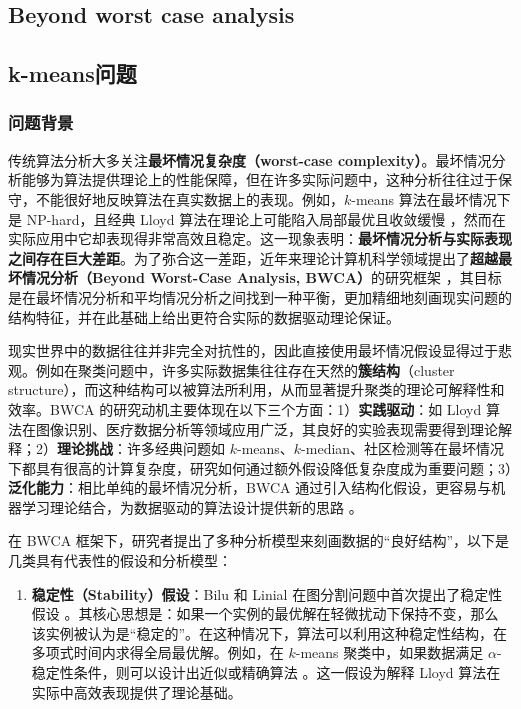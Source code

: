 \documentclass[lang=cn,newtx,10pt,scheme=chinese,chinesefont=nofont,citestyle=gb7714-2015, bibstyle=gb7714-2015]{elegantbook}
\begin{document}
\begin{refsection}
\chapter{Beyond worst case analysis}

\section{k-means问题}
\subsection{问题背景}

传统算法分析大多关注\textbf{最坏情况复杂度（worst-case complexity）}。最坏情况分析能够为算法提供理论上的性能保障，但在许多实际问题中，这种分析往往过于保守，不能很好地反映算法在真实数据上的表现。例如，$k$-means 算法在最坏情况下是 NP-hard，且经典 Lloyd 算法在理论上可能陷入局部最优且收敛缓慢 \cite{arthur2006kmeans, vattani2011hardness}，然而在实际应用中它却表现得非常高效且稳定。这一现象表明：\textbf{最坏情况分析与实际表现之间存在巨大差距}。为了弥合这一差距，近年来理论计算机科学领域提出了\textbf{超越最坏情况分析（Beyond Worst-Case Analysis, BWCA）}的研究框架 \cite{roughgarden2021beyond}，其目标是在最坏情况分析和平均情况分析之间找到一种平衡，更加精细地刻画现实问题的结构特征，并在此基础上给出更符合实际的数据驱动理论保证。

现实世界中的数据往往并非完全对抗性的，因此直接使用最坏情况假设显得过于悲观。例如在聚类问题中，许多实际数据集往往存在天然的\textbf{簇结构}（cluster structure），而这种结构可以被算法所利用，从而显著提升聚类的理论可解释性和效率。BWCA 的研究动机主要体现在以下三个方面：1）\textbf{实践驱动}：如 Lloyd 算法在图像识别、医疗数据分析等领域应用广泛，其良好的实验表现需要得到理论解释；2）\textbf{理论挑战}：许多经典问题如 $k$-means、$k$-median、社区检测等在最坏情况下都具有很高的计算复杂度，研究如何通过额外假设降低复杂度成为重要问题；3）\textbf{泛化能力}：相比单纯的最坏情况分析，BWCA 通过引入结构化假设，更容易与机器学习理论结合，为数据驱动的算法设计提供新的思路 \cite{awasthi2012stability, balcan2013clustering}。

在 BWCA 框架下，研究者提出了多种分析模型来刻画数据的“良好结构”，以下是几类具有代表性的假设和分析模型：
\begin{enumerate}
    \item \textbf{稳定性（Stability）假设}：Bilu 和 Linial 在图分割问题中首次提出了稳定性假设 \cite{bilu2010stability}。其核心思想是：如果一个实例的最优解在轻微扰动下保持不变，那么该实例被认为是“稳定的”。在这种情况下，算法可以利用这种稳定性结构，在多项式时间内求得全局最优解。例如，在 $k$-means 聚类中，如果数据满足 $\alpha$-稳定性条件，则可以设计出近似或精确算法 \cite{awasthi2012stability}。这一假设为解释 Lloyd 算法在实际中高效表现提供了理论基础。


\end{enumerate}
\end{refsection}
\end{document}
